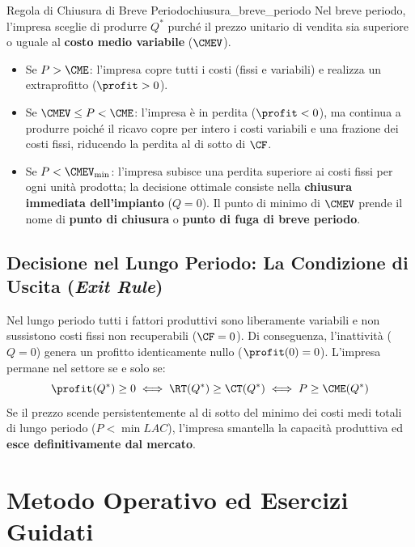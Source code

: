 \begin{legge}{Regola di Chiusura di Breve Periodo}{chiusura_breve_periodo}
Nel breve periodo, l'impresa sceglie di produrre $Q^*$ purché il prezzo unitario di vendita sia superiore o uguale al \textbf{costo medio variabile} ($\CMEV$).
\begin{itemize}
    \item Se $P > \CME$: l'impresa copre tutti i costi (fissi e variabili) e realizza un extraprofitto ($\profit > 0$).
    \item Se $\CMEV \le P < \CME$: l'impresa è in perdita ($\profit < 0$), ma continua a produrre poiché il ricavo copre per intero i costi variabili e una frazione dei costi fissi, riducendo la perdita al di sotto di $\CF$.
    \item Se $P < \CMEV_{\min}$: l'impresa subisce una perdita superiore ai costi fissi per ogni unità prodotta; la decisione ottimale consiste nella \textbf{chiusura immediata dell'impianto} ($Q = 0$). Il punto di minimo di $\CMEV$ prende il nome di \textbf{punto di chiusura} o \textbf{punto di fuga di breve periodo}.
\end{itemize}
\end{legge}

\subsection{Decisione nel Lungo Periodo: La Condizione di Uscita (\textit{Exit Rule})}
Nel lungo periodo tutti i fattori produttivi sono liberamente variabili e non sussistono costi fissi non recuperabili ($\CF = 0$). Di conseguenza, l'inattività ($Q=0$) genera un profitto identicamente nullo ($\profit(0) = 0$). L'impresa permane nel settore se e solo se:
\begin{equation}
    \profit(Q^*) \ge 0 \iff \RT(Q^*) \ge \CT(Q^*) \iff P \ge \CME(Q^*)
    \label{eq:regola_uscita_lungo}
\end{equation}
Se il prezzo scende persistentemente al di sotto del minimo dei costi medi totali di lungo periodo ($P < \min LAC$), l'impresa smantella la capacità produttiva ed \textbf{esce definitivamente dal mercato}.

\section{Metodo Operativo ed Esercizi Guidati}

